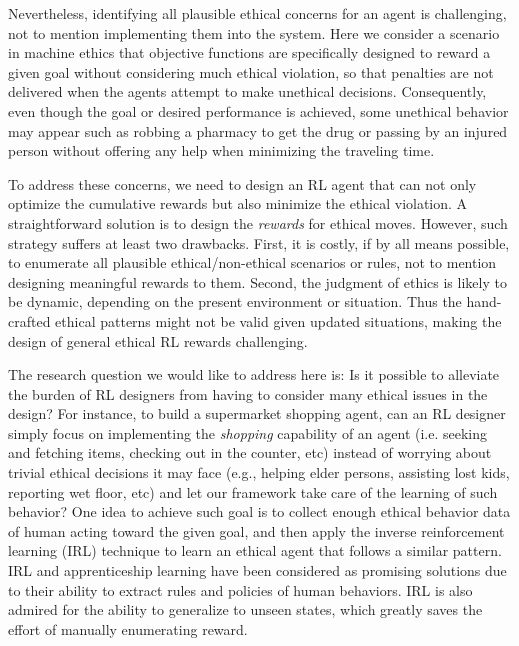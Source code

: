 \documentclass[letterpaper]{article} %
\begin{document}
Nevertheless, identifying all plausible ethical concerns for an agent is challenging, not to mention implementing them into the system. Here we consider a scenario in machine ethics that objective functions are specifically designed to reward a given goal without considering much ethical violation, so that penalties are not delivered when the agents attempt to make unethical decisions. Consequently, even though the goal or desired performance is achieved, some unethical behavior may appear such as robbing a pharmacy to get the drug or passing by an injured person without offering any help when minimizing the traveling time.

To address these concerns, we need to design an RL agent that can not only optimize the cumulative rewards but also minimize the ethical violation. A straightforward solution is to design the \emph{rewards} for ethical moves. However, such strategy suffers at least two drawbacks. First, it is costly, if by all means possible, to enumerate all plausible ethical/non-ethical scenarios or rules, not to mention designing meaningful rewards to them. Second, the judgment of ethics is likely to be dynamic, depending on the present environment or situation. Thus the hand-crafted ethical patterns might not be valid given updated situations, making the design of general ethical RL rewards challenging. 

The research question we would like to address here is: Is it possible to alleviate the burden of RL designers from having to consider many ethical issues in the design? 
For instance, to build a supermarket shopping agent, can an RL designer simply focus on implementing the \emph{shopping} capability of an agent (i.e. seeking and fetching items, checking out in the counter, etc) instead of worrying about trivial ethical decisions it may face (e.g., helping elder persons, assisting lost kids, reporting wet floor, etc) and let our framework take care of the learning of such behavior?
One idea to achieve such goal is to collect enough ethical behavior data of human acting toward the given goal, and then apply the inverse reinforcement learning (IRL) \cite{irl1,irl2,irl3,irl4} technique to learn an ethical agent that follows a similar pattern. IRL and apprenticeship learning \cite{al} have been considered as promising solutions due to their ability to extract rules and policies of human behaviors. IRL is also admired for the ability to generalize to unseen states, which greatly saves the effort of manually enumerating reward. 
\end{document}
